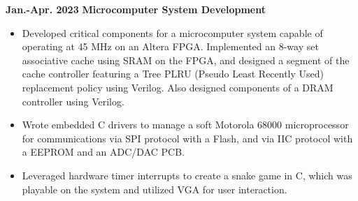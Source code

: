 \documentclass[11pt,a4paper,sans]{moderncv}
\begin{document}
\cventry
{\textnormal{\textbf{Jan.-Apr. 2023}}}
{\textnormal{\textbf{Microcomputer System Development}}}
{}{}{}
{
    \begin{itemize}
    \item Developed critical components for a microcomputer system capable of operating at 45 MHz on an Altera FPGA. Implemented an 8-way set associative cache using SRAM on the FPGA, and designed a segment of the cache controller featuring a Tree PLRU (Pseudo Least Recently Used) replacement policy using Verilog. Also designed components of a DRAM controller using Verilog.
    \item Wrote embedded C drivers to manage a soft Motorola 68000 microprocessor for communications via SPI protocol with a Flash, and via IIC protocol with a EEPROM and an ADC/DAC PCB.
    \item Leveraged hardware timer interrupts to create a snake game in C, which was playable on the system and utilized VGA for user interaction.
    \end{itemize}
}


\end{document}
